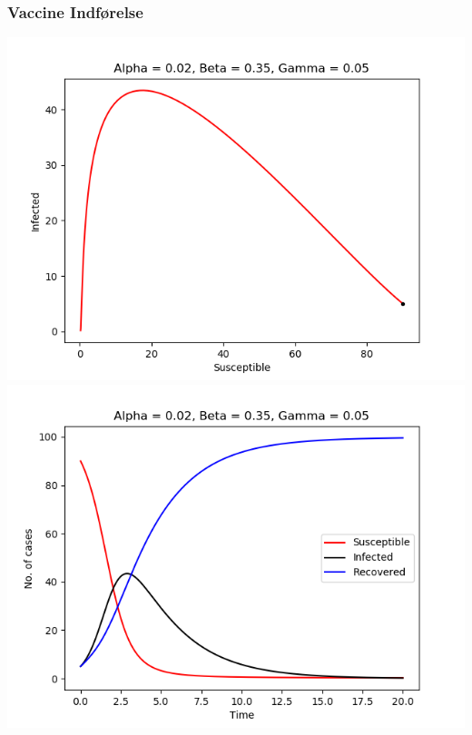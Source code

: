 \begin{frame}
\frametitle{Vaccine Indførelse}
\includegraphics[scale=0.295]{img/a2_b35_g5.png}
\includegraphics[scale=0.295]{img/t_a2_b35_g5.png}
\end{frame}